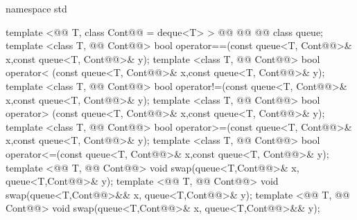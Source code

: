 \documentclass[american,twoside]{book}
\begin{document}
\begin{codeblock}
namespace std {
  template <@@ T, class Cont@@ = deque<T> >
    @@
          @@
          @@
    class queue;
  template <class T, @@ Cont@@>
    bool operator==(const queue<T, Cont@@>& x,const queue<T, Cont@@>& y);
  template <class T, @@ Cont@@>
    bool operator< (const queue<T, Cont@@>& x,const queue<T, Cont@@>& y);
  template <class T, @@ Cont@@>
    bool operator!=(const queue<T, Cont@@>& x,const queue<T, Cont@@>& y);
  template <class T, @@ Cont@@>
    bool operator> (const queue<T, Cont@@>& x,const queue<T, Cont@@>& y);
  template <class T, @@ Cont@@>
    bool operator>=(const queue<T, Cont@@>& x,const queue<T, Cont@@>& y);
  template <class T, @@ Cont@@>
    bool operator<=(const queue<T, Cont@@>& x,const queue<T, Cont@@>& y);
  template <@@ T, @@ Cont@@>
    void swap(queue<T,Cont@@>& x, queue<T,Cont@@>& y);
  template <@@ T, @@ Cont@@>
    void swap(queue<T,Cont@@>&& x, queue<T,Cont@@>& y);
  template <@@ T, @@ Cont@@>
    void swap(queue<T,Cont@@>& x, queue<T,Cont@@>&& y);

}
\end{codeblock}
\end{document}
